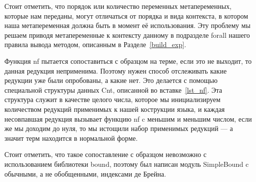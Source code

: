\hfill

%

Стоит отметить, что порядок или количество переменных метапеременных, которые нам переданы, могут отличаться от порядка и вида контекста, в котором наша метапеременная должна быть в момент её использования. Эту проблему мы решаем приводя метапеременные к контексту данному в подразделе forall нашего правила вывода методом, описанным в Разделе~\ref{build_exp}.

Функция nf пытается сопоставиться с образцом на терме, если это не выходит, то данная редукция неприменима. Поэтому нужен способ отслеживать какие редукции уже были опробованы, а какие нет. Это делается с помощью специальной структуры данных Cnt, описанной во вставке~\ref{lst_nf}. Эта структура служит в качестве целого числа, которое мы инициализируем количеством редукций применимых к нашей кострукции языка, и каждая несовпавшая редукция вызывает функцию nf c меньшим и меньшим числом, если же мы доходим до нуля, то мы истощили набор применимых редукций --- а значит терм находится в нормальной форме.

Стоит отметить, что такое сопоставление с образцом невозможно с использованием библиотеки bound\cite{bound}, поэтому был написан модуль SimpleBound c обычными, а не обобщенными, индексами де Брейна.

